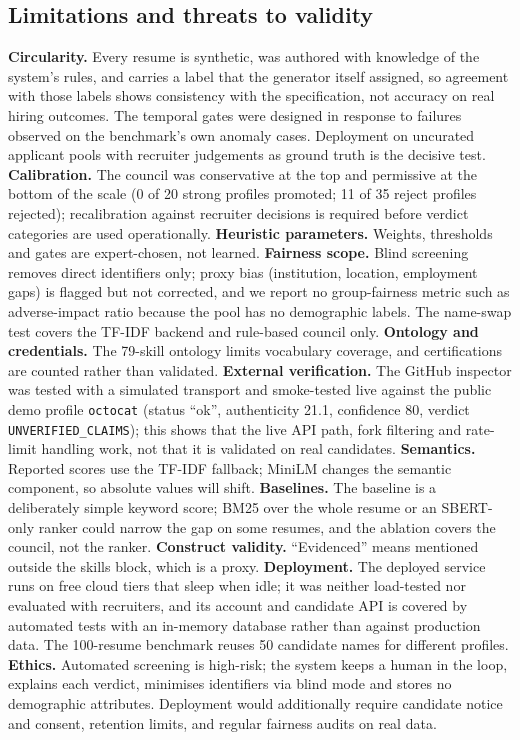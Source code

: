 \documentclass[conference]{IEEEtran}
\newcommand{\flag}[1]{\texttt{\footnotesize #1}}
\begin{document}
\subsection{Limitations and threats to validity}
\textbf{Circularity.} Every resume is synthetic, was authored with knowledge of the system's rules, and carries a label that the generator itself assigned, so agreement with those labels shows consistency with the specification, not accuracy on real hiring outcomes. The temporal gates were designed in response to failures observed on the benchmark's own anomaly cases. Deployment on uncurated applicant pools with recruiter judgements as ground truth is the decisive test. \textbf{Calibration.} The council was conservative at the top and permissive at the bottom of the scale (0 of 20 strong profiles promoted; 11 of 35 reject profiles rejected); recalibration against recruiter decisions is required before verdict categories are used operationally. \textbf{Heuristic parameters.} Weights, thresholds and gates are expert-chosen, not learned. \textbf{Fairness scope.} Blind screening removes direct identifiers only; proxy bias (institution, location, employment gaps) is flagged but not corrected, and we report no group-fairness metric such as adverse-impact ratio because the pool has no demographic labels. The name-swap test covers the TF-IDF backend and rule-based council only. \textbf{Ontology and credentials.} The 79-skill ontology limits vocabulary coverage, and certifications are counted rather than validated. \textbf{External verification.} The GitHub inspector was tested with a simulated transport and smoke-tested live against the public demo profile \texttt{octocat} (status ``ok'', authenticity 21.1, confidence 80, verdict \flag{UNVERIFIED\_CLAIMS}); this shows that the live API path, fork filtering and rate-limit handling work, not that it is validated on real candidates. \textbf{Semantics.} Reported scores use the TF-IDF fallback; MiniLM changes the semantic component, so absolute values will shift. \textbf{Baselines.} The baseline is a deliberately simple keyword score; BM25 over the whole resume or an SBERT-only ranker could narrow the gap on some resumes, and the ablation covers the council, not the ranker. \textbf{Construct validity.} ``Evidenced'' means mentioned outside the skills block, which is a proxy. \textbf{Deployment.} The deployed service runs on free cloud tiers that sleep when idle; it was neither load-tested nor evaluated with recruiters, and its account and candidate API is covered by automated tests with an in-memory database rather than against production data. The 100-resume benchmark reuses 50 candidate names for different profiles. \textbf{Ethics.} Automated screening is high-risk; the system keeps a human in the loop, explains each verdict, minimises identifiers via blind mode and stores no demographic attributes. Deployment would additionally require candidate notice and consent, retention limits, and regular fairness audits on real data.
\end{document}
